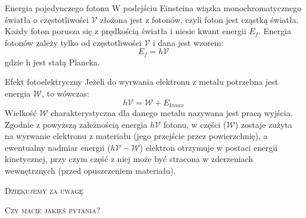 \documentclass{cubeamer}
\begin{document}
	\begin{frame}{Energia pojedynczego fotonu}
		W podejściu Einsteina wiązka monochromatycznego światła o częstotliwości $\mathcal{V}$
		złożona jest z fotonów, czyli foton jest cząstką światła. Każdy foton porusza
		się z prędkością światła i niesie kwant energii $E_{f}$. Energia fotonów
		zależy tylko od częstotliwości $\mathcal{V}$ i dana jest wzorem:
		\begin{equation}
			E_{f}=h\mathcal{V}
		\end{equation}
		gdzie h jest stałą Plancka.
	\end{frame}

	\begin{frame}{Efekt fotoelektryczny}
		Jeżeli do wyrwania elektronu z metalu potrzebna jest energia $\mathcal{W}$,
		to wówczas:
		\begin{equation}
			h\mathcal{V}=\mathcal{W}+E_{kmax}
		\end{equation}
		Wielkość $\mathcal{W}$ charakterystyczna dla danego metalu nazywana jest pracą
		wyjścia.
		\newline
		\newline
		Zgodnie z powyższą zależnością energia $h\mathcal{V}$ fotonu, w części ($\mathcal{W}$)
		zostaje zużyta na wyrwanie elektronu z materiału (jego przejście przez
		powierzchnię), a ewentualny nadmiar energii ($h\mathcal{V}-\mathcal{W}$)
		elektron otrzymuje w postaci energii kinetycznej, przy czym część z niej może
		być stracona w zderzeniach wewnętrznych (przed opuszczeniem materiału).
	\end{frame}

	\begin{frame}[standout]
		\Huge\textsc{Dziękujemy za uwagę}

		\vfill

		\LARGE\textsc{Czy macie jakieś pytania?}
	\end{frame}
\end{document}
